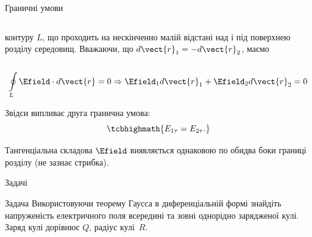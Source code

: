 \documentclass{beamer}
\begin{document}
\begin{frame}{Граничні умови}{}
\begin{onlyenv}
\begin{columns}
\begin{column}{0.6\linewidth}
\begin{block}{}
					контуру $L$, що проходить на нескінченно малій відстані над і під поверхнею
					розділу середовищ. Вважаючи, що $d\vect{r}_1 = -d\vect{r}_2$, маємо
				\end{block}
			\end{column}
			\begin{column}{0.4\linewidth}\centering
				
			\end{column}
		\end{columns}
		\begin{block}{}\small
			\begin{equation*}
				\oint\limits_L \Efield\cdot d\vect{r} = 0 \Rightarrow \Efield_1 d\vect{r}_1 +
				\Efield_2 d\vect{r}_2 = 0
			\end{equation*}
		\end{block}
		\begin{block}{}
			Звідси випливає друга гранична умова:
			\begin{equation*}
				\tcbhighmath{
					E_{1\tau} = E_{2\tau}.
				}
			\end{equation*}
		\end{block}
		\begin{alertblock}{}\justifying\small
			Тангенціальна складова $\Efield$ виявляється однаковою по обидва боки границі розділу (не
			зазнає стрибка).
		\end{alertblock}
	\end{onlyenv}
\end{frame}



\begin{frame}{Задачі}{}
	\begin{exampleblock}{Задача}\justifying
		Використовуючи теорему Гаусса в диференціальній формі знайдіть напруженість
		електричного поля всередині та зовні однорідно зарядженої кулі. Заряд кулі дорівнює
		$Q$, радіус кулі~$R$.
	\end{exampleblock}
\end{frame}
\end{document}
